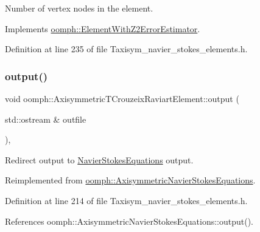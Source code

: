 Number of vertex nodes in the element. 



Implements \hyperlink{classoomph_1_1ElementWithZ2ErrorEstimator_a19495a0e77ef4ff35f15fdf7913b4077}{oomph\+::\+Element\+With\+Z2\+Error\+Estimator}.



Definition at line 235 of file Taxisym\+\_\+navier\+\_\+stokes\+\_\+elements.\+h.

\mbox{\label{classoomph_1_1AxisymmetricTCrouzeixRaviartElement_a25336476c872ea2e5c26698f44d7d35d}} 
\subsubsection{\texorpdfstring{output()}{output()}\hspace{0.1cm}{\footnotesize\ttfamily [1/4]}}
{\footnotesize\ttfamily void oomph\+::\+Axisymmetric\+T\+Crouzeix\+Raviart\+Element\+::output (\begin{DoxyParamCaption}\item[{std\+::ostream \&}]{outfile }\end{DoxyParamCaption})\hspace{0.3cm}{\ttfamily [inline]}, {\ttfamily [virtual]}}



Redirect output to \hyperlink{classoomph_1_1NavierStokesEquations}{Navier\+Stokes\+Equations} output. 



Reimplemented from \hyperlink{classoomph_1_1AxisymmetricNavierStokesEquations_afe0c7b607ec3fd03a73b7db4f1fe6252}{oomph\+::\+Axisymmetric\+Navier\+Stokes\+Equations}.



Definition at line 214 of file Taxisym\+\_\+navier\+\_\+stokes\+\_\+elements.\+h.



References oomph\+::\+Axisymmetric\+Navier\+Stokes\+Equations\+::output().

\mbox{\label{classoomph_1_1AxisymmetricTCrouzeixRaviartElement_ae59a58576380d29570f9ea326d653e5b}} 
